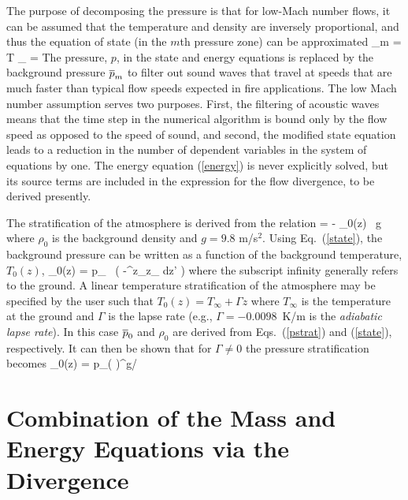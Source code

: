 The purpose of decomposing the pressure is that for low-Mach number flows, it can be assumed that the temperature and density are inversely
proportional, and thus the equation of state (in the $m$th pressure zone) can be approximated
\be \bp_m  =  \rho T \R \sum_\alpha {} =   \label{state} \ee
The pressure, $p$, in the state and energy equations is replaced by the background pressure $\overline{p}_m$ to filter out sound waves
that travel at speeds that are much faster
than typical flow speeds expected in fire applications. The low Mach number assumption serves two purposes. First, the filtering of acoustic waves
means that the time step in the numerical algorithm is bound only by the flow speed as opposed to the speed of sound, and second, the modified state
equation leads to a reduction in the number of dependent variables in the system of equations by one. The energy equation (\ref{energy}) is never
explicitly solved, but its source terms are included in the expression for the flow divergence, to be derived presently.

The stratification of the atmosphere is derived from the relation
\be {} = - \rho_0(z) \, g  \ee
where $\rho_0$ is the background density and $g=9.8$ m/s$^2$. Using Eq.~(\ref{state}), the background pressure can be written as a function of the background temperature, $T_0(z)$,
\be \bp_0(z) = p_\infty \; \exp \, \left( -\int^z_{z_\infty}  dz' \right)  \label{pstrat} \ee
where the subscript infinity generally refers to the ground. A linear temperature stratification of the atmosphere may be
specified by the user such that $T_0(z) = T_\infty + \Gamma z$ where $T_\infty$ is the temperature at the ground and
$\Gamma$ is the lapse rate (e.g., $\Gamma = -0.0098$~K/m is the {\em adiabatic lapse rate}).
In this case $\overline{p}_0$ and $\rho_0$ are derived from Eqs.~(\ref{pstrat}) and (\ref{state}), respectively.
It can then be shown that for $\Gamma \ne 0$ the pressure stratification becomes
\be
   \bp_0(z) = p_\infty  \left(  \right)^{g/\R \Gamma}
   \label{pstrat2}
\ee


\section{Combination of the Mass and Energy Equations via the Divergence}

